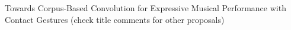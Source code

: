 Towards Corpus-Based Convolution for Expressive Musical Performance with Contact Gestures (check title comments for other proposals)
